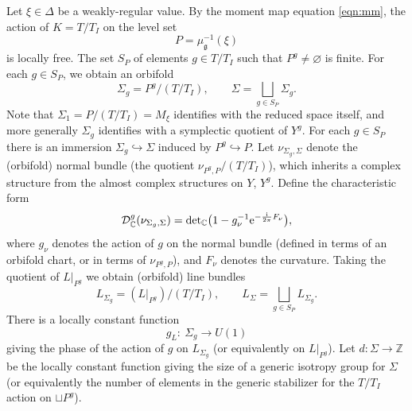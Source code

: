 \documentclass[pdftex]{sigma}
\numberwithin{equation}{section}
\newcommand{\tn}[1]{\textnormal{#1}}
\renewcommand{\i}{{\mathrm{i}}}
\def\g{\ensuremath{\mathfrak{g}}}
\def\bC{\ensuremath{\mathbb{C}}}
\def\bZ{\ensuremath{\mathbb{Z}}}
\def\calDC{\ensuremath{\mathcal{D}_{\bC}}}
\begin{document}
Let $\xi \in \Delta$ be a weakly-regular value. By the moment map equation \eqref{eqn:mm}, the action of $K=T/T_I$ on the level set
\[ P=\mu_\g^{-1}(\xi) \]
is locally free. The set $S_P$ of elements $g \in T/T_I$ such that $P^g\ne \varnothing$ is finite. For each $g \in S_P$, we obtain an orbifold
\[ \Sigma_g=P^g/(T/T_I), \qquad \Sigma=\bigsqcup_{g \in S_P} \Sigma_g.\]
Note that $\Sigma_1=P/(T/T_I)=M_\xi$ identifies with the reduced space itself, and more generally $\Sigma_g$ identifies with a symplectic quotient of $Y^g$. For each $g \in S_P$ there is an immersion $\Sigma_g\hookrightarrow \Sigma$ induced by $P^g\hookrightarrow P$. Let $\nu_{\Sigma_g,\Sigma}$ denote the (orbifold) normal bundle (the quotient $\nu_{P^g,P}/(T/T_I)$), which inherits a complex structure from the almost complex structures on $Y$, $Y^g$. Define the characteristic form
\[ \calDC^g(\nu_{\Sigma_g,\Sigma})=\tn{det}_\bC\big(1-g_\nu^{-1} {\rm e}^{-\frac{\i}{2\pi}F_\nu}\big), \]
where $g_\nu$ denotes the action of $g$ on the normal bundle (defined in terms of an orbifold chart, or in terms of $\nu_{P^g,P}$), and $F_\nu$ denotes the curvature. Taking the quotient of $L|_{P^g}$ we obtain (orbifold) line bundles
\[ L_{\Sigma_g}=(L|_{P^g})/(T/T_I), \qquad L_\Sigma=\bigsqcup_{g \in S_P} L_{\Sigma_g}. \]
There is a locally constant function
\[ g_L \colon \ \Sigma_g \rightarrow U(1) \]
giving the phase of the action of $g$ on $L_{\Sigma_g}$ (or equivalently on $L|_{P^g}$). Let $d \colon \Sigma \rightarrow \bZ$ be the locally constant function giving the size of a generic isotropy group for $\Sigma$ (or equivalently the number of elements in the generic stabilizer for the $T/T_I$ action on $\sqcup P^g$).
\end{document}
